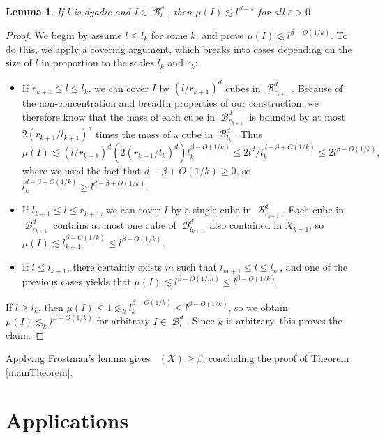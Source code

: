 \documentclass[dvipsnames,letterpaper,12pt]{article}
\theoremstyle{plain}
\newtheorem{lemma}{Lemma}
\DeclareMathOperator{\hausdim}{\dim_{\mathbf{H}}}
\DeclareMathOperator{\B}{\mathcal{B}}
\begin{document}
\begin{lemma}
	If $l$ is dyadic and $I \in \B_l^d$, then $\mu(I) \lesssim l^{\beta - \varepsilon}$ for all $\varepsilon > 0$.
\end{lemma}
\begin{proof}
	We begin by assume $l \leq l_k$ for some $k$, and prove $\mu(I) \lesssim l^{\beta - O(1/k)}$. To do this, we apply a covering argument, which breaks into cases depending on the size of $l$ in proportion to the scales $l_k$ and $r_k$:
	\begin{itemize}
		\item If $r_{k+1} \leq l \leq l_k$, we can cover $I$ by $(l/r_{k+1})^d$ cubes in $\B^d_{r_{k+1}}$. Because of the non-concentration and breadth properties of our construction, we therefore know that the mass of each cube in $\B^d_{r_{k+1}}$ is bounded by at most $2 (r_{k+1}/l_{k+1})^d$ times the mass of a cube in $\B_{l_k}^d$. Thus
		\[ \mu(I) \lesssim (l/r_{k+1})^d (2(r_{k+1}/l_k)^d) l_k^{\beta - O(1/k)} \leq 2l^d/l_k^{d - \beta + O(1/k)} \leq 2l^{\beta - O(1/k)}, \]
		where we used the fact that $d - \beta + O(1/k) \geq 0$, so $l_k^{d - \beta + O(1/k)} \geq l^{d - \beta + O(1/k)}$.

		\item If $l_{k+1} \leq l \leq r_{k+1}$, we can cover $I$ by a single cube in $\B^d_{r_{k+1}}$. Each cube in $\B^d_{r_{k+1}}$ contains at most one cube of $\B^d_{l_{k+1}}$ also contained in $X_{k+1}$, so $\mu(I) \lesssim l_{k+1}^{\beta - O(1/k)} \leq l^{\beta - O(1/k)}$.

		\item If $l \leq l_{k+1}$, there certainly exists $m$ such that $l_{m+1} \leq l \leq l_m$, and one of the previous cases yields that $\mu(I) \lesssim l^{\beta - O(1/m)} \leq l^{\beta - O(1/k)}$.
	\end{itemize}
	If $l \geq l_k$, then $\mu(I) \leq 1 \lesssim_k l_k^{\beta - O(1/k)} \leq l^{\beta - O(1/k)}$, so we obtain $\mu(I) \lesssim_k l^{\beta - O(1/k)}$ for arbitrary $I \in \B_l^d$. Since $k$ is arbitrary, this proves the claim.
\end{proof}

Applying Frostman's lemma gives $\hausdim(X) \geq \beta$, concluding the proof of Theorem \ref{mainTheorem}.









\section{Applications}\label{applications}
\end{document}
